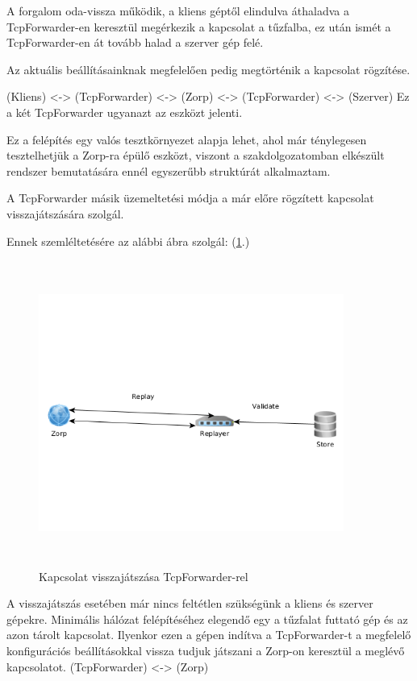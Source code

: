 \documentclass[a4paper,12pt,oneside]{report}
\begin{document}
A forgalom oda-vissza működik, a kliens géptől elindulva áthaladva a TcpForwarder-en keresztül megérkezik a kapcsolat a tűzfalba, ez után ismét a TcpForwarder-en át tovább halad a szerver gép felé.

Az aktuális beállításainknak megfelelően pedig megtörténik a kapcsolat rögzítése.

(Kliens) <-> (TcpForwarder) <-> (Zorp) <-> (TcpForwarder) <-> (Szerver)
Ez a két TcpForwarder ugyanazt az eszközt jelenti.

Ez a felépítés egy valós tesztkörnyezet alapja lehet, ahol már ténylegesen tesztelhetjük a Zorp-ra épülő eszközt, viszont a szakdolgozatomban elkészült rendszer bemutatására ennél egyszerűbb struktúrát alkalmaztam.

A TcpForwarder másik üzemeltetési módja a már előre rögzített kapcsolat visszajátszására szolgál.

Ennek szemléltetésére az alábbi ábra szolgál: (\ref{fig:replay}.)

\begin{figure}[h]
  \includegraphics[width=10cm,height=10cm,keepaspectratio]{replay.png}
  \caption{Kapcsolat visszajátszása TcpForwarder-rel}
  \label{fig:replay}
\end{figure}

A visszajátszás esetében már nincs feltétlen szükségünk a kliens és szerver gépekre.
Minimális hálózat felépítéséhez elegendő egy a tűzfalat futtató gép és az azon tárolt kapcsolat. Ilyenkor ezen a gépen indítva a TcpForwarder-t a megfelelő konfigurációs beállításokkal vissza tudjuk játszani a Zorp-on keresztül a meglévő kapcsolatot.
(TcpForwarder) <-> (Zorp)
\end{document}
